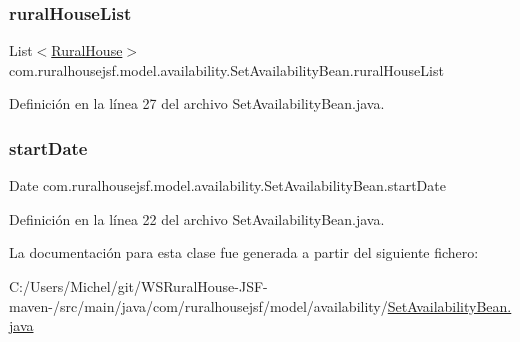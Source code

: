 \subsubsection{\texorpdfstring{ruralHouseList}{ruralHouseList}}
{\footnotesize\ttfamily List$<$\mbox{\hyperlink{classcom_1_1ruralhousejsf_1_1domain_1_1_rural_house}{Rural\+House}}$>$ com.\+ruralhousejsf.\+model.\+availability.\+Set\+Availability\+Bean.\+rural\+House\+List\hspace{0.3cm}{\ttfamily [private]}}



Definición en la línea 27 del archivo Set\+Availability\+Bean.\+java.

\mbox{\label{classcom_1_1ruralhousejsf_1_1model_1_1availability_1_1_set_availability_bean_a6962c301508cdd26f40a28468d59009c}} 
\subsubsection{\texorpdfstring{startDate}{startDate}}
{\footnotesize\ttfamily Date com.\+ruralhousejsf.\+model.\+availability.\+Set\+Availability\+Bean.\+start\+Date\hspace{0.3cm}{\ttfamily [private]}}



Definición en la línea 22 del archivo Set\+Availability\+Bean.\+java.



La documentación para esta clase fue generada a partir del siguiente fichero\+:\begin{DoxyCompactItemize}
\item 
C\+:/\+Users/\+Michel/git/\+W\+S\+Rural\+House-\/\+J\+S\+F-\/maven-\//src/main/java/com/ruralhousejsf/model/availability/\mbox{\hyperlink{_set_availability_bean_8java}{Set\+Availability\+Bean.\+java}}\end{DoxyCompactItemize}

